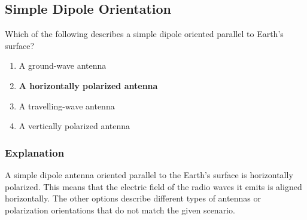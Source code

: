 \subsection{Simple Dipole Orientation}
\label{T9A03}

\begin{tcolorbox}[colback=gray!10!white,colframe=black!75!black,title=T9A03]
Which of the following describes a simple dipole oriented parallel to Earth's surface?
\begin{enumerate}[noitemsep]
    \item A ground-wave antenna
    \item \textbf{A horizontally polarized antenna}
    \item A travelling-wave antenna
    \item A vertically polarized antenna
\end{enumerate}
\end{tcolorbox}

\subsubsection*{Explanation}
A simple dipole antenna oriented parallel to the Earth's surface is horizontally polarized. This means that the electric field of the radio waves it emits is aligned horizontally. The other options describe different types of antennas or polarization orientations that do not match the given scenario.